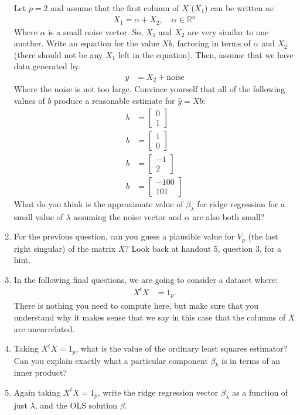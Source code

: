 \documentclass[12pt,hidelinks]{article}
\numberwithin{equation}{section}
\begin{document}
\begin{enumerate}
Let $p=2$ and assume that the first column of $X$ ($X_1$) can be written as:
\begin{align}
X_1 = \alpha + X_2, \quad \alpha \in \mathbb{R}^n
\end{align}
Where $\alpha$ is a small noise vector. So, $X_1$ and $X_2$ are very similar to
one another. Write an equation for the value $X b$, factoring in terms of $\alpha$
and $X_2$ (there should not be any $X_1$ left in the equation). Then, assume that
we have data generated by:
\begin{align}
y &= X_2 + \text{noise}
\end{align}
Where the noise is not too large. Convince yourself that all of the following
values of $b$ produce a reasonable estimate for $\widehat{y} = X b$:
\begin{align}
b &= \begin{bmatrix} 0 \\ 1 \end{bmatrix} \\
b &= \begin{bmatrix} 1 \\ 0 \end{bmatrix} \\
b &= \begin{bmatrix} -1 \\ 2 \end{bmatrix} \\
b &= \begin{bmatrix} -100 \\ 101 \end{bmatrix}
\end{align}
What do you think is the approximate value of $\beta_\lambda$ for ridge
regression for a small value of $\lambda$ assuming the noise vector and $\alpha$
are also both small?
\item For the previous question, can you guess a plausible value for $V_p$
(the last right singular) of the matrix $X$? Look back at handout 5, question 3,
for a hint.
\item In the following final questions, we are going to consider a dataset
where:
\begin{align}
X^t X &= 1_p.
\end{align}
There is nothing you need to compute here, but make sure that you understand
why it makes sense that we say in this case that the columns of $X$ are uncorrelated.
\item Taking $X^t X = 1_p$, what is the value of the ordinary least
squares estimator? Can you explain exactly what a particular component $\beta_k$
is in terms of an inner product?
\item Again taking $X^t X = 1_p$, write the ridge regression vector
$\beta_\lambda$ as a function of just  $\lambda$, and the OLS solution $\beta$.
\end{enumerate}
\end{document}
